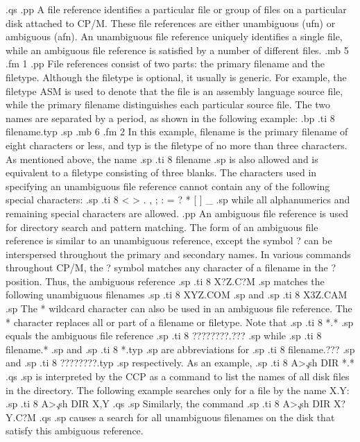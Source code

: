 .qs
.pp
A file reference identifies a particular file or group of files on a 
particular disk attached to CP/M.  These file references are 
either unambiguous (ufn) or ambiguous (afn).  An unambiguous file 
reference uniquely identifies a single file, while an ambiguous file 
reference is satisfied by a number of different files.
.mb 5
.fm 1
.pp
File references consist of two parts:  the primary filename and the 
filetype.  Although the filetype is optional, it usually is 
generic.  For example, the filetype ASM is used to denote that the file is an 
assembly language source file, while the primary filename distinguishes each 
particular source file.  The two names are separated by a period, as shown 
in the following example:
.bp
.ti 8
filename.typ
.sp
.mb 6
.fm 2
In this example, filename is the primary filename of eight characters or 
less, and typ 
is the filetype of no more than three characters.  As mentioned above, the 
name
.sp
.ti 8
filename
.sp
is also allowed and is equivalent to a filetype consisting of 
three blanks.  The characters used in specifying an unambiguous 
file reference cannot contain any of the following special 
characters:
.sp
.ti 8
< > . , ; : = ? * [ ] _ %
.sp
while all alphanumerics and remaining special characters are allowed.
.pp
An ambiguous file reference is used for directory search and pattern 
matching.  The form of an ambiguous file reference is similar to an 
unambiguous reference, except the symbol ? can be interspersed throughout 
the primary and secondary names.  In various commands throughout CP/M, 
the ? symbol matches any character of a filename in the ? position.  
Thus, the ambiguous reference
.sp
.ti 8
X?Z.C?M
.sp
matches the following unambiguous filenames
.sp
.ti 8
XYZ.COM
.sp
and
.sp
.ti 8
X3Z.CAM
.sp
The * wildcard character can also be used in an ambiguous file 
reference.  The * character replaces all or part of a filename or 
filetype.  Note that
.sp
.ti 8
*.*
.sp
equals the ambiguous file reference 
.sp
.ti 8
????????.???
.sp
while
.sp
.ti 8
filename.*
.sp
and
.sp
.ti 8
*.typ
.sp
are abbreviations for
.sp
.ti 8
filename.???
.sp
and
.sp
.ti 8
????????.typ
.sp
respectively.  As an example,
.sp
.ti 8
A>\c
.sh
DIR *.*
.qs
.sp
is interpreted by the CCP as a command to list the names of all disk files 
in the directory.  The following example searches only for a file 
by the name X.Y:
.sp
.ti 8
A>\c
.sh
DIR X,Y
.qs
.sp
Similarly, the command
.sp
.ti 8
A>\c
.sh
DIR X?Y.C?M
.qs
.sp
causes a search for all unambiguous filenames on the disk that satisfy 
this ambiguous reference.
